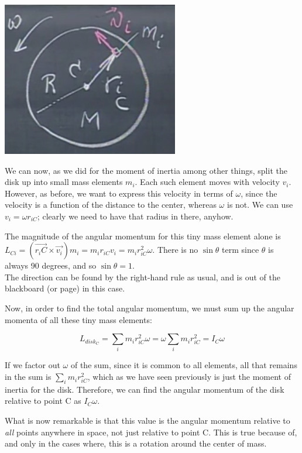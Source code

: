 \documentclass[12pt,a4paper]{report}
\begin{document}
\begin{center}
\includegraphics[scale=0.7]{Graphics/lec20_spin_angular_momentum}
\end{center}

We can now, as we did for the moment of inertia among other things, split the disk up into small mass elements $m_i$. Each such element moves with velocity $v_i$. However, as before, we want to express this velocity in terms of $\omega$, since the velocity is a function of the distance to the center, whereas $\omega$ is not. We can use $v_i = \omega r_{iC}$; clearly we need to have that radius in there, anyhow.

The magnitude of the angular momentum for this tiny mass element alone is $L_{Ci} = (\vec{r_iC} \times \vec{v_i}) m_i = m_i r_{iC} v_i = m_i r_{iC}^2 \omega$. There is no $\sin \theta$ term since $\theta$ is always 90 degrees, and so $\sin \theta = 1$.\\
The direction can be found by the right-hand rule as usual, and is out of the blackboard (or page) in this case.

Now, in order to find the total angular momentum, we must sum up the angular momenta of all these tiny mass elements:

\begin{equation}
L_{disk_C} = \sum_i m_i r_{iC}^2 \omega = \omega \sum_i m_i r_{iC}^2 = I_C \omega
\end{equation}

If we factor out $\omega$ of the sum, since it is common to all elements, all that remains in the sum is $\sum_i m_i r_{iC}^2$, which as we have seen previously is just the moment of inertia for the disk. Therefore, we can find the angular momentum of the disk relative to point C as $I_C \omega$.

What is now remarkable is that this value is the angular momentum relative to \emph{all} points anywhere in space, not just relative to point C. This is true because of, and only in the cases where, this is a rotation around the center of mass.
\end{document}
